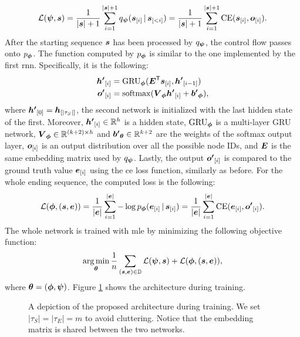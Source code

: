 $$\Loss(\EncParam, \Vector{s}) = \frac{1}{|\Vector{s}|+1} \sum_{i=1}^{|\Vector{s}|+1} q_{\EncParam}(\Elem{s}{i} \given \Elem{s}{<i}) = \frac{1}{|\Vector{s}|+1} \sum_{i=1}^{|\Vector{s}|+1} \mathrm{CE}(\Elem{s}{i}, \Elem{o}{i}).$$
After the starting sequence $\Vector{s}$ has been processed by $q_{\boldsymbol{\psi}}$, the control flow passes onto $p_{\boldsymbol{\phi}}$. The function computed by $p_{\boldsymbol{\phi}}$ is similar to the one implemented by the first \gls{rnn}. Specifically, it is the following:
\begin{align*}
    \Elem{h'}{i} &= \Op{GRU}_{\DecParam}(\Matrix{E}^{\Transpose}\Elem{s}{i}, \Elem{h'}{i-1})\\
    \Elem{o'}{i} &= \softmax(\Matrix{V}_{\DecParam}\Elem{h'}{i} + \Vector{b'}_{\DecParam}),
\end{align*}
where $\Elem{h'}{0} = \Elem{h}{|\tau_S|}$, \ie the second network is initialized with the last hidden state of the first. Moreover, $\Elem{h'}{i} \in \Real^h$ is a hidden state, $\operatorname{GRU}_{\boldsymbol{\phi}}$ is a multi-layer GRU network, $\Matrix{V}_{\DecParam} \in \Real^{(k+2) \times h}$ and $\Vector{b'}_{\Param} \in \Real^{k+2}$ are the weights of the softmax output layer, $\Elem{o}{i}$ is an output distribution over all the possible node IDs, and $\Matrix{E}$ is the same embedding matrix used by $q_{\boldsymbol{\psi}}$.  Lastly, the output $\Elem{o'}{i}$ is compared to the ground truth value $\Elem{e}{i}$ using the \gls{ce} loss function, similarly as before. For the whole ending sequence, the computed loss is the following:
$$\Loss(\DecParam, (\Vector{s}, \Vector{e})) = \frac{1}{|\Vector{e}|} \sum_{i=1}^{|\Vector{e}|} - \log p_{\DecParam}(\Elem{e}{i} \given \Elem{s}{i}) = \frac{1}{|\Vector{e}|} \sum_{i=1}^{|\Vector{e}|} \mathrm{CE}(\Elem{e}{i}, \Elem{o'}{i}).$$
The whole network is trained with \gls{mle} by minimizing the following objective function:
$$\argmin_{\Param} \frac{1}{n} \sum_{(\Vector{s},\Vector{e}) \in \Data} \Loss(\EncParam, \Vector{s}) + \Loss(\DecParam, (\Vector{s}, \Vector{e})),$$
where $\boldsymbol{\theta} = (\boldsymbol{\phi}, \boldsymbol{\psi})$. Figure \ref{fig:model-training} shows the architecture during training.

\begin{figure}[h!]
    \centering
    \resizebox{.8\textwidth}{!}{}
    \caption{A depiction of the proposed architecture during training. We set $|\tau_S| = |\tau_E| = m$ to avoid cluttering. Notice that the embedding matrix is shared between the two networks.}
    \label{fig:model-training}
\end{figure}

